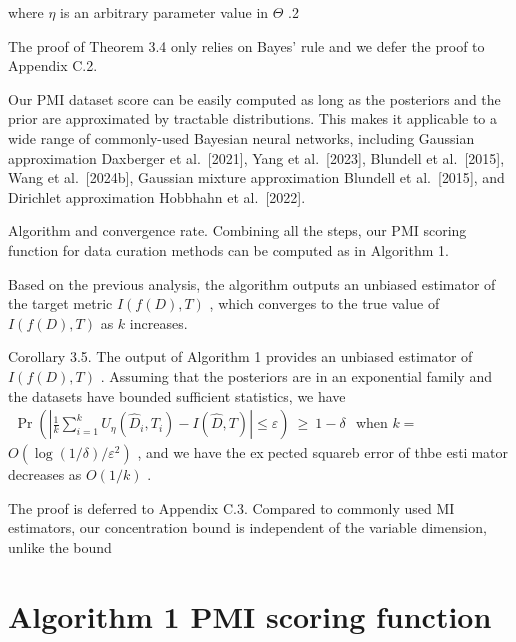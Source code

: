 where \(\eta\) is an arbitrary parameter value in \(\Theta\) .2

The proof of Theorem 3.4 only relies on Bayes' rule and we defer the
proof to Appendix C.2.

Our PMI dataset score can be easily computed as long as the posteriors
and the prior are approximated by tractable distributions. This makes it
applicable to a wide range of commonly-used Bayesian neural networks,
including Gaussian approximation Daxberger et al.~{[}2021{]}, Yang et
al.~{[}2023{]}, Blundell et al.~{[}2015{]}, Wang et al.~{[}2024b{]},
Gaussian mixture approximation Blundell et al.~{[}2015{]}, and Dirichlet
approximation Hobbhahn et al.~{[}2022{]}.

Algorithm and convergence rate. Combining all the steps, our PMI scoring
function for data curation methods can be computed as in Algorithm 1.

Based on the previous analysis, the algorithm outputs an unbiased
estimator of the target metric \(I ( f ( D ) , T )\) , which converges
to the true value of \(I ( f ( D ) , T )\) as \(k\) increases.

Corollary 3.5. The output of Algorithm 1 provides an unbiased estimator
of \(I ( f ( D ) , T )\) . Assuming that the posteriors are in an
exponential family and the datasets have bounded sufficient statistics,
we have
\(\begin{array} { r } { \operatorname* { P r } \left( \left| \frac { 1 } { k } \sum _ { i = 1 } ^ { k } U _ { \eta } ( \widehat { D } _ { i } , T _ { i } ) - I ( \widehat { D } , T ) \right| \leq \varepsilon \right) \ \geq \ 1 - \delta } \end{array}\)
when \(k =\) \(O ( \log ( 1 / \delta ) / \varepsilon ^ { 2 } )\) , and
we have the expected squareb error of thbe estimator decreases as
\(O ( 1 / k )\) .

The proof is deferred to Appendix C.3. Compared to commonly used MI
estimators, our concentration bound is independent of the variable
dimension, unlike the bound

\section{Algorithm 1 PMI scoring
function}\label{algorithm-1-pmi-scoring-function}

